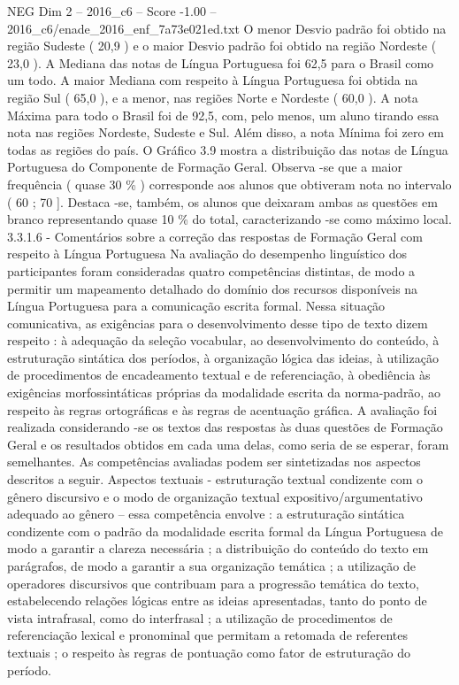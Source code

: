 \begin{textsample}{NEG Dim 2 – 2016\_c6 – Score -1.00 – 2016\_c6/enade\_2016\_enf\_7a73e021ed.txt}
O menor Desvio padrão foi obtido na região Sudeste ( 20,9 ) e o maior Desvio padrão foi obtido na região Nordeste ( 23,0 ).
A Mediana das notas de Língua Portuguesa foi 62,5 para o Brasil como um todo.
A maior Mediana com respeito à Língua Portuguesa foi obtida na região Sul ( 65,0 ), e a menor, nas regiões Norte e Nordeste ( 60,0 ).
A nota Máxima para todo o Brasil foi de 92,5, com, pelo menos, um aluno tirando essa nota nas regiões Nordeste, Sudeste e Sul.
Além disso, a nota Mínima foi zero em todas as regiões do país.
O Gráfico 3.9 mostra a distribuição das notas de Língua Portuguesa do Componente de Formação Geral.
Observa -se que a maior frequência ( quase 30 \% ) corresponde aos alunos que obtiveram nota no intervalo ( 60 ; 70 ].
Destaca -se, também, os alunos que deixaram ambas as questões em branco representando quase 10 \% do total, caracterizando -se como máximo local. 3.3.1.6 - Comentários sobre a correção das respostas de Formação Geral com respeito à Língua Portuguesa Na avaliação do desempenho linguístico dos participantes foram consideradas quatro competências distintas, de modo a permitir um mapeamento detalhado do domínio dos recursos disponíveis na Língua Portuguesa para a comunicação escrita formal.
Nessa situação comunicativa, as exigências para o desenvolvimento desse tipo de texto dizem respeito : à adequação da seleção vocabular, ao desenvolvimento do conteúdo, à estruturação sintática dos períodos, à organização lógica das ideias, à utilização de procedimentos de encadeamento textual e de referenciação, à obediência às exigências morfossintáticas próprias da modalidade escrita da norma-padrão, ao respeito às regras ortográficas e às regras de acentuação gráfica.
A avaliação foi realizada considerando -se os textos das respostas às duas questões de Formação Geral e os resultados obtidos em cada uma delas, como seria de se esperar, foram semelhantes.
As competências avaliadas podem ser sintetizadas nos aspectos descritos a seguir.
Aspectos textuais - estruturação textual condizente com o gênero discursivo e o modo de organização textual expositivo/argumentativo adequado ao gênero – essa competência envolve : a estruturação sintática condizente com o padrão da modalidade escrita formal da Língua Portuguesa de modo a garantir a clareza necessária ; a distribuição do conteúdo do texto em parágrafos, de modo a garantir a sua organização temática ; a utilização de operadores discursivos que contribuam para a progressão temática do texto, estabelecendo relações lógicas entre as ideias apresentadas, tanto do ponto de vista intrafrasal, como do interfrasal ; a utilização de procedimentos de referenciação lexical e pronominal que permitam a retomada de referentes textuais ; o respeito às regras de pontuação como fator de estruturação do período.

\end{textsample}
